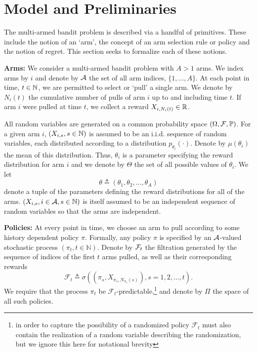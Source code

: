 \section{Model and Preliminaries} \label{sec:model_and_prelim}

The multi-armed bandit problem is described via a handful of primitives. These include the notion of an `arm', the concept of an arm selection rule or policy and the notion of regret. This section seeks to formalize each of these notions.

\noindent\textbf{\textsf{Arms:}}
We consider a multi-armed bandit problem with $A > 1$ arms. We index arms by $i$ and denote by $\mathcal A$ the set of all arm indices, $\{1,\ldots,A\}$. At each point in time, $t \in \mathbb{N}$, we are permitted to select or `pull' a single arm. We denote by $N_i(t)$ the cumulative number of pulls of arm $i$ up to and including time $t$. If arm $i$ were pulled at time $t$, we collect a reward  $X_{i,N_i(t)} \in \mathbb{R}$. 

All random variables are generated on a common probability space $\left(\Omega, \mathcal F, \mathbb{P}\right)$. For a given arm $i$, $(X_{i,s}, s \in \mathbb{N})$ is assumed to be an i.i.d. sequence of random variables, each distributed according to a distribution $p_{\theta_i}(\cdot)$. Denote by $\mu(\theta_i)$ the mean of this distribution. Thus, $\theta_i$ is a parameter specifying the reward distribution for arm $i$ and we denote by $\Theta$ the set of all possible values of $\theta_i$. 
We let 
\[
\theta \triangleq \left(\theta_1,\theta_2, \dots, \theta_A\right)
\]
denote a tuple of the parameters defining the reward distributions for all of the arms. $(X_{i,s}, i \in \mathcal A, s \in \mathbb{N})$ is itself assumed to be an independent sequence of random variables so that the arms are independent. 


\noindent\textbf{\textsf{Policies:}} At every point in time, we choose an arm to pull according to some history dependent policy $\pi$. Formally, any policy $\pi$ is specified by an $\mathcal A$-valued stochastic process $(\pi_t, t \in \mathbb{N})$. Denote by $\mathcal F_t$ the filtration generated by the sequence of indices of the first $t$ arms pulled, as well as their corresponding rewards
\[
\mathcal{F}_t
\triangleq
\sigma\left(
\left(
\pi_s, X_{\pi_s,N_{\pi_s}(s)}
\right)
, s=1,2,\dots,t
\right).
\]
We require that the process $\pi_t$ be $\mathcal{F}_t$-predictable,\footnote{in order to capture the possibility of a randomized policy $\mathcal{F}_t$ must also contain the realization of a random variable describing the randomization, but we ignore this here for notational brevity} and denote by $\Pi$ the space of all such policies. 

